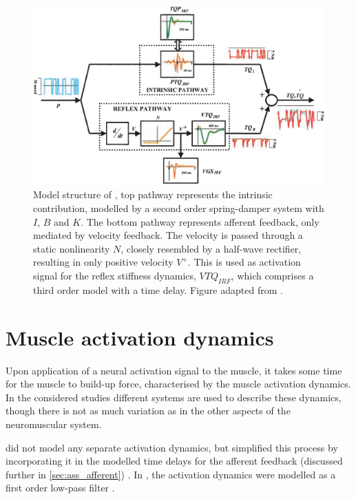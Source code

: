 \begin{figure}[t]
    \centering
    \includegraphics[width=\linewidth]{Figures/models_assumptions/model_mirbagheri_2000.png}
    \caption{Model structure of \citeauthor{mirbagheri_intrinsic_2000}, top pathway represents the intrinsic contribution, modelled by a second order spring-damper system with $I$, $B$ and $K$. The bottom pathway represents afferent feedback, only mediated by velocity feedback. The velocity is passed through a static nonlinearity $N$, closely resembled by a half-wave rectifier, resulting in only positive velocity $V^+$. This is used as activation signal for the reflex stiffness dynamics, $VTQ_{IRF}$, which comprises  a third order model with a time delay. Figure adapted from \citet{mirbagheri_intrinsic_2000}.}
    \label{fig:model_mirbagheri_2000}
\end{figure}



\section{Muscle activation dynamics}
\label{sec:muscle_act_dyn}
Upon application of a neural activation signal to the muscle, it takes some time for the muscle to build-up force, characterised by the muscle activation dynamics. In the considered studies different systems are used to describe these dynamics, though there is not as much variation as in the other aspects of the neuromuscular system. 

\citeauthor{zhang_simultaneous_1997} did not model any separate activation dynamics, but simplified this process by incorporating it in the modelled time delays for the afferent feedback (discussed further in \autoref{sec:ass_afferent}) \cite{zhang_simultaneous_1997}. In \citeauthor{van_der_helm_identification_2002}, the activation dynamics were modelled as a first order low-pass filter \cite{van_der_helm_identification_2002}. 

